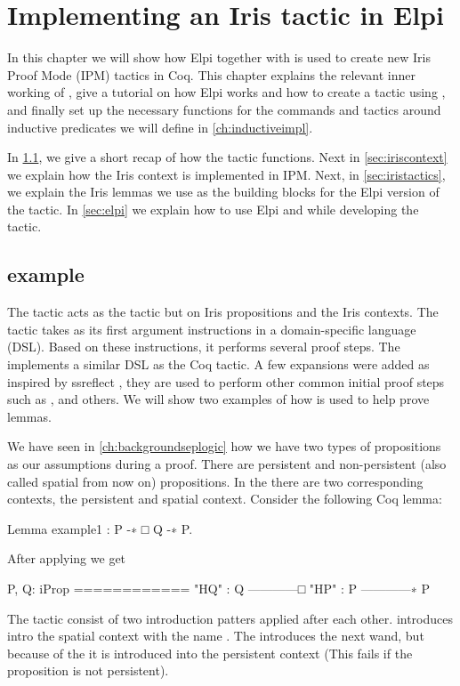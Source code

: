 \documentclass[thesis.tex]{subfiles}
\begin{document}
\VerbatimFootnotes

\chapter{Implementing an Iris tactic in Elpi} \label{ch:IrisElpi}
In this chapter we will show how Elpi together with \ce is used to create new Iris Proof Mode (IPM) tactics in Coq.
This chapter explains the relevant inner working of \IPM, give a tutorial on how Elpi works and how to create a tactic using \ce, and finally set up the necessary functions for the commands and tactics around inductive predicates we will define in \cref{ch:inductiveimpl}.

In \cref{sec:introsex}, we give a short recap of how the  tactic functions. Next in \cref{sec:iriscontext} we explain how the Iris context is implemented in IPM. Next, in \cref{sec:iristactics}, we explain the Iris lemmas we use as the building blocks for the Elpi version of the tactic. In \cref{sec:elpi} we explain how to use Elpi and \ce while developing the  tactic.

\section[iIntros example]{ example}\label{sec:introsex}
The \IPM {} tactic acts as the  tactic but on Iris propositions and the Iris contexts. The  tactic takes as its first argument instructions in a domain-specific language (DSL). Based on these instructions, it performs several proof steps. The  implements a similar DSL as the Coq tactic. A few expansions were added as inspired by ssreflect \cite{huetCoqProofAssistant1997, gonthierSmallScaleReflection2016}, they are used to perform other common initial proof steps such as ,  and others. We will show two examples of how  is used to help prove lemmas.

We have seen in \cref{ch:backgroundseplogic} how we have two types of propositions as our assumptions during a proof. There are persistent and non-persistent (also called spatial from now on) propositions.
In the \IPM there are two corresponding contexts, the persistent and spatial context. Consider the following Coq lemma:
\begin{coqcode}
  Lemma example1 : P -∗ □ Q -∗ P.
\end{coqcode}
After applying  we get
\begin{coqcode}
  P, Q: iProp
  ============
  "HQ" : Q
  ------------□
  "HP" : P
  ------------∗
  P
\end{coqcode}
The tactic  consist of two introduction patters applied after each other.  introduces  intro the spatial context with the name . The  introduces the next wand, but because of the \coqi{#} it is introduced into the persistent context (This fails if the proposition is not persistent).
\end{document}
